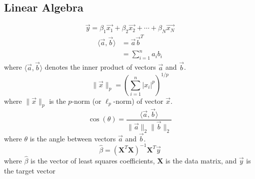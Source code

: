 \subsection{Linear Algebra}
\begin{equation}
    \vec{y} = \beta_1 \vec{x_1} + \beta_2 \vec{x_2} + \cdots + \beta_N \vec{x_N}
\end{equation}
\begin{align}
    \langle \vec{a}, \vec{b} \rangle & = \vec{a}\vec{b}^{T}     \\
                                     & = \sum_{i=1}^{n} a_i b_i
\end{align}
where $\langle \vec{a}, \vec{b} \rangle$ denotes the inner product of vectors $\vec{a}$ and $\vec{b}$.
\begin{equation}
    \|\vec{x}\|_p = \left( \sum_{i=1}^{n} |x_i|^p \right)^{1/p}
\end{equation}
where $\|\vec{x}\|_p$ is the $p$-norm (or $\ell_p$-norm) of vector $\vec{x}$.
\begin{equation}
    \cos(\theta) = \frac{\langle \vec{a}, \vec{b} \rangle}{\|\vec{a}\|_2 \|\vec{b}\|_2}
\end{equation}
where $\theta$ is the angle between vectors $\vec{a}$ and $\vec{b}$.
\begin{equation}
    \hat{\beta} = (\mathbf{X}^T \mathbf{X})^{-1} \mathbf{X}^T \vec{y}
\end{equation}
where $\hat{\beta}$ is the vector of least squares coefficients, $\mathbf{X}$ is the data matrix, and $\vec{y}$ is the target vector

